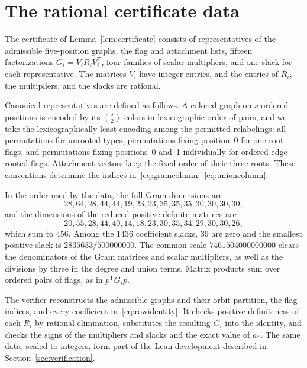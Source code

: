 \section{The rational certificate data}\label{app:data}
The certificate of Lemma~\ref{lem:certificate} consists of representatives of the admissible five-position graphs, the flag and attachment lists, fifteen factorizations $G_i=V_iR_iV_i^{\mathsf T}$, four families of scalar multipliers, and one slack for each representative. The matrices $V_i$ have integer entries, and the entries of $R_i$, the multipliers, and the slacks are rational.

Canonical representatives are defined as follows. A colored graph on $s$ ordered positions is encoded by its $\binom{s}{2}$ colors in lexicographic order of pairs, and we take the lexicographically least encoding among the permitted relabelings: all permutations for unrooted types, permutations fixing position~0 for one-root flags, and permutations fixing positions~0 and~1 individually for ordered-edge-rooted flags. Attachment vectors keep the fixed order of their three roots. These conventions determine the indices in~\eqref{eq:gramcolumn}--\eqref{eq:unioncolumn}.

In the order used by the data, the full Gram dimensions are
\[
 28,64,28,44,44,19,23,23,35,35,35,30,30,30,30,
\]
and the dimensions of the reduced positive definite matrices are
\[
 20,55,28,44,40,14,18,23,30,35,34,29,30,30,26,
\]
which sum to $456$. Among the $1436$ coefficient slacks, $39$ are zero and the smallest positive slack is $2835633/500000000$. The common scale $7461504000000000$ clears the denominators of the Gram matrices and scalar multipliers, as well as the divisions by three in the degree and union terms. Matrix products sum over ordered pairs of flags, as in $p^{\mathsf T}G_ip$.

The verifier reconstructs the admissible graphs and their orbit partition, the flag indices, and every coefficient in~\eqref{eq:rowidentity}. It checks positive definiteness of each $R_i$ by rational elimination, substitutes the resulting $G_i$ into the identity, and checks the signs of the multipliers and slacks and the exact value of $a_*$. The same data, scaled to integers, form part of the Lean development described in Section~\ref{sec:verification}.
